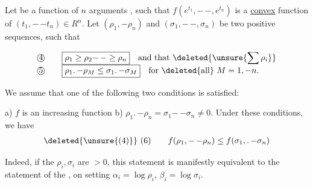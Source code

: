   Let  be a   function of $n$  arguments , such that $f(e^{t_1},\mathord{-}\,\mathord{-},e^{t_n})$ is a \uline{convex} function of $(t_1,\mathord{-}\,\mathord{-}t_n)\in R^n$. Let $(\rho_1,\mathord{-}\rho_n)$ and $(\sigma_1,\mathord{-}\,\mathord{-},\sigma_n)$ be two  positive sequences, such that 

{\reversemarginpar{}}
\[
\begin{array}{@{}l@{\qquad}l@{}}
\text{\textcircled{4}}&\displaystyle\boxed{\rho_1\geq\rho_2\mathord{-}\,\mathord{-}\geq\rho_n}\quad\text{and that }\deleted{\unsure{\sum\rho_i}}\\
\text{\textcircled{5}}&\displaystyle\boxed{\rho_1\mathord{.}\,\mathord{-}\rho_M\leq\sigma_1\mathord{.}\,\mathord{-}\sigma_M}\quad\text{for }\deleted{\text{all}}\ M=1,\mathord{-}n.
\end{array}
\]

We assume that one of the following two conditions is satisfied:

{\reversemarginpar{}}

a) $f$ is  an increasing function    b) $\rho_1\mathord{.}\,\mathord{-}\rho_n=\sigma_1\mathord{-}\,\mathord{-}\sigma_n\ne0$. Under these conditions, we have
\[
\begin{array}{@{}l@{\qquad}l@{}}
\deleted{\unsure{(4)}}\ (6)&\displaystyle f(\rho_1,\mathord{-}\,\mathord{-}\rho_n)\leq f(\sigma_1,\mathord{.}\,\mathord{-}\sigma_n)
\end{array}
\]

Indeed, if the $\rho_i,\sigma_i$ are $>0$, this statement is manifestly equivalent to the statement of the , on setting $\alpha_i=\log\rho_i$, $\beta_i=\log\sigma_i$. 

